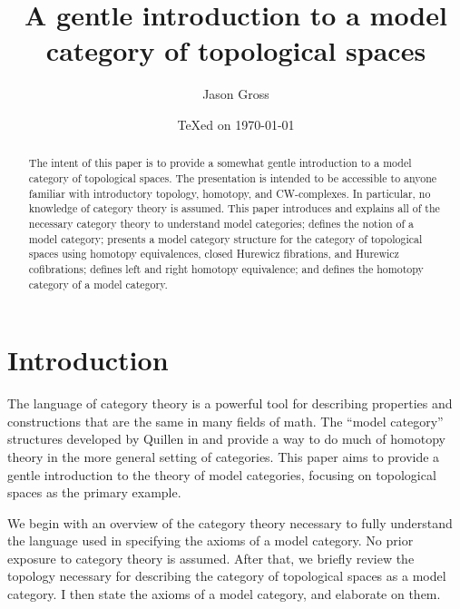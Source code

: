 \documentclass{amsart}
\theoremstyle{definition} \newaliasedtheorem{defn}[thm]{Definition}
\theoremstyle{definition} \newtheorem*{defn*}{Definition}
\theoremstyle{definition} \newaliasedtheorem{xca}[thm]{Exercise}
\theoremstyle{definition} \newtheorem*{soln*}{Solution}
\theoremstyle{definition} \newaliasedtheorem{remark}[thm]{Remark}
\theoremstyle{definition} \newtheorem*{remark*}{Remark}
\begin{document}
\title{A gentle introduction to a model category of topological spaces}
\author[J. Gross]{Jason Gross}
\address{Massachusetts Institute of Technology}
\date{\TeX ed on \today}

\begin{abstract}
  The intent of this paper is to provide a somewhat gentle introduction to a model category of topological spaces.  The presentation is intended to be accessible to anyone familiar with introductory topology, homotopy, and CW-complexes.  In particular, no knowledge of category theory is assumed.  This paper introduces and explains all of the necessary category theory to understand model categories; defines the notion of a model category; presents a model category structure for the category of topological spaces using homotopy equivalences, closed Hurewicz fibrations, and Hurewicz cofibrations; defines left and right homotopy equivalence; and defines the homotopy category of a model category.
\end{abstract}

\maketitle

\section{Introduction}
  The language of category theory is a powerful tool for describing properties and constructions that are the same in many fields of math.  The ``model category'' structures developed by Quillen in \cite{quillen1967homotopical} and \cite{quillen1969rational} provide a way to do much of homotopy theory in the more general setting of categories.  This paper aims to provide a gentle introduction to the theory of model categories, focusing on topological spaces as the primary example.
  
  We begin with an overview of the category theory necessary to fully understand the language used in specifying the axioms of a model category.  No prior exposure to category theory is assumed.  After that, we briefly review the topology necessary for describing the category of topological spaces as a model category.  I then state the axioms of a model category, and elaborate on them.
  
\end{document}
